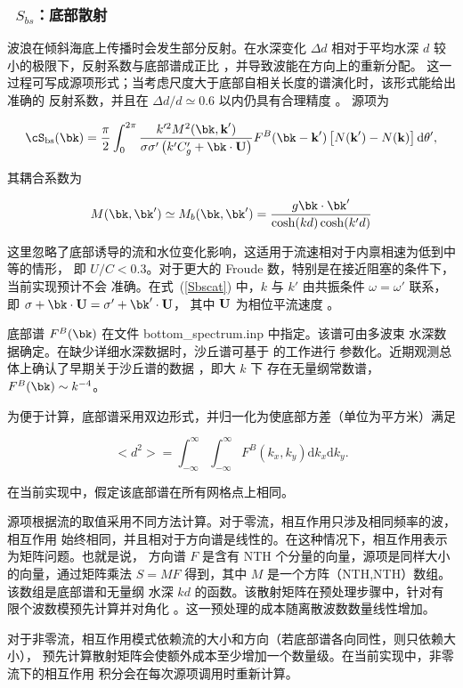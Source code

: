 \vsssub
\subsubsection{~$S_{bs}$：底部散射} \label{sec:BS1}
\vsssub


\noindent
波浪在倾斜海底上传播时会发生部分反射。在水深变化 $\Delta d$ 相对于平均水深 $d$
较小的极限下，反射系数与底部谱成正比 \cite{art:Kre49}，并导致波能在方向上的重新分配。
这一过程可写成源项形式；当考虑尺度大于底部自相关长度的谱演化时，该形式能给出准确的
反射系数，并且在 $\Delta d / d \simeq 0.6$ 以内仍具有合理精度 \citep{art:AM07}。
源项为

\begin{equation}
\cS_{\mathrm{bs}}({\bk}) =
\frac{\pi}{2}\int_{0}^{2 \pi}
 \frac{k'^2 M^2({\bk},\textbf{k}')}{\sigma \sigma' \left(k' C'_g +
{\bk}  \cdot {\bf U}  \right)}
 F^B({\bk}-\textbf{k}')
\left[N(\textbf{k}')- N(\textbf{k})\right] {\mathrm d}
\theta',\label{Sbscat}
\end{equation}

\noindent
其耦合系数为

\begin{equation}
M({\bk},{\bk}^\prime)\simeq M_b({\bk},{\bk}^\prime) =\frac{g {\bk}
\cdot {\bk}^\prime}{\cosh(kd)\cosh(k'd)}
\end{equation}

\noindent
这里忽略了底部诱导的流和水位变化影响，这适用于流速相对于内禀相速为低到中等的情形，
即 $U/C < 0.3$。对于更大的 Froude 数，特别是在接近阻塞的条件下，当前实现预计不会
准确。在式~(\ref{Sbscat}) 中，$k$ 与 $k'$ 由共振条件 $\omega=\omega'$ 联系，
即 $\sigma+{\bk} \cdot {\bf U}=\sigma' + {\bk}^\prime \cdot {\bf U}$，
其中 ${\bf U}$ 为相位平流速度 \cite[参见，例如][]{tol:WISE07}。

底部谱 $F^B({\bk})$ 在文件 {\file bottom\_spectrum.inp} 中指定。该谱可由多波束
水深数据确定。在缺少详细水深数据时，沙丘谱可基于 \cite{art:Hino68} 的工作进行
参数化。近期观测总体上确认了早期关于沙丘谱的数据 \citep{art:AM07}，即大 $k$ 下
存在无量纲常数谱，$F^B({\bk}) \sim k^{-4}$。

为便于计算，底部谱采用双边形式，并归一化为使底部方差（单位为平方米）满足

\begin{equation}
<d^2> =\int_{-\infty}^{\infty} \int_{-\infty}^{\infty}
F^B(k_x,k_y)  {\mathrm d} k_x  {\mathrm d} k_y.
\end{equation}

\noindent
在当前实现中，假定该底部谱在所有网格点上相同。

源项根据流的取值采用不同方法计算。对于零流，相互作用只涉及相同频率的波，相互作用
始终相同，并且相对于方向谱是线性的。在这种情况下，相互作用表示为矩阵问题。也就是说，
方向谱 $F$ 是含有 {\F NTH} 个分量的向量，源项是同样大小的向量，通过矩阵乘法
$S = M F$ 得到，其中 $M$ 是一个方阵（{\F NTH,NTH}）数组。该数组是底部谱和无量纲
水深 $kd$ 的函数。该散射矩阵在预处理步骤中，针对有限个波数模预先计算并对角化
\citep{art:AH02}。这一预处理的成本随离散波数数量线性增加。

对于非零流，相互作用模式依赖流的大小和方向（若底部谱各向同性，则只依赖大小），
预先计算散射矩阵会使额外成本至少增加一个数量级。在当前实现中，非零流下的相互作用
积分会在每次源项调用时重新计算。
